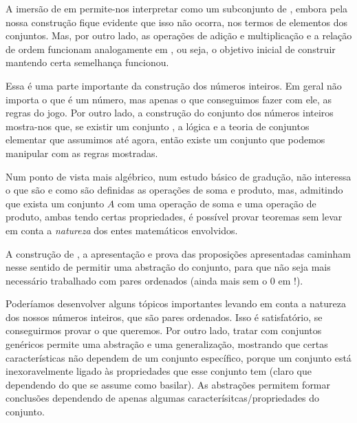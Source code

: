\documentclass[../main.tex]{subfiles}
\begin{document}
A imersão de \N em \Z permite-nos interpretar \N como um subconjunto de \Z, embora pela nossa construção fique evidente que isso não ocorra, nos termos de elementos dos conjuntos. Mas, por outro lado, as operações de adição e multiplicação e a relação de ordem funcionam analogamente em \Z, ou seja, o objetivo inicial de construir mantendo certa semelhança funcionou.

Essa é uma parte importante da construção dos números inteiros. Em geral não importa o que é um número, mas apenas o que conseguimos fazer com ele, as regras do jogo. Por outro lado, a construção do conjunto dos números inteiros mostra-nos que, se existir um conjunto \N, a lógica e a teoria de conjuntos elementar que assumimos até agora, então existe um conjunto \Z que podemos manipular com as regras mostradas.

Num ponto de vista mais algébrico, num estudo básico de gradução, não interessa o que são e como são definidas as operações de soma e produto, mas, admitindo que exista um conjunto $A$ com uma operação de soma e uma operação de produto, ambas tendo certas propriedades, é possível provar teoremas sem levar em conta a \emph{natureza} dos entes matemáticos envolvidos.

A construção de \Z, a apresentação e prova das proposições apresentadas caminham nesse sentido de permitir uma abstração do conjunto, para que não seja mais necessário trabalhado com pares ordenados (ainda mais sem o $0$ em \N!).

Poderíamos desenvolver alguns tópicos importantes levando em conta a natureza dos nossos números inteiros, que são pares ordenados. Isso é satisfatório, se conseguirmos provar o que queremos. Por outro lado, tratar com conjuntos genéricos permite uma abstração e uma generalização, mostrando que certas características não dependem de um conjunto específico, porque um conjunto está inexoravelmente ligado às propriedades que esse conjunto tem (claro que dependendo do que se assume como basilar). As abstrações permitem formar conclusões dependendo de apenas algumas caracterísitcas/propriedades do conjunto.
\end{document}

